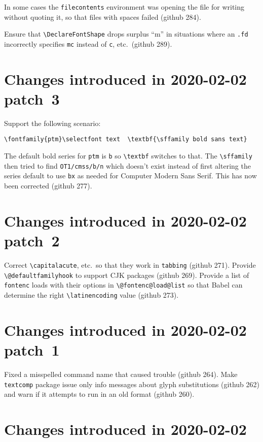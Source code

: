 \documentclass{ltxguide}
\newcommand\ghissue[1]{github #1}
\newcommand\ghissue[1]{%
    \href{https://github.com/latex3/latex2e/issues/#1}{github #1}}
\begin{document}
In some cases the \texttt{filecontents} environment was opening the
file for writing without quoting it, so that files with spaces failed
(\ghissue{284}).

Ensure that \verb=\DeclareFontShape= drops surplus ``m'' in situations
where an \texttt{.fd} incorrectly specifies \texttt{mc} instead of
\texttt{c}, etc.\ (\ghissue{289}).

\section{Changes introduced in 2020-02-02 patch~3}

Support the following scenario:
\begin{verbatim}
\fontfamily{ptm}\selectfont text  \textbf{\sffamily bold sans text}
\end{verbatim}
The default bold series for \texttt{ptm} is \texttt{b} so
\verb=\textbf= switches to that. The \verb=\sffamily= then tried to
find \texttt{OT1/cmss/b/n} which doesn't exist instead of first
altering the series default to use \texttt{bx} as needed for Computer
Modern Sans Serif. This has now been corrected (\ghissue{277}).


\section{Changes introduced in 2020-02-02 patch~2}

Correct \verb=\capitalacute=, etc.\ so that they work in
\texttt{tabbing} (\ghissue{271}).  Provide \verb=\@defaultfamilyhook= to
support CJK packages (\ghissue{269}).  Provide a list of \texttt{fontenc}
loads with their options in \verb=\@fontenc@load@list= so that Babel
can determine the right \verb=\latinencoding= value (\ghissue{273}).


\section{Changes introduced in 2020-02-02 patch~1}

Fixed a misspelled command name that caused trouble (\ghissue{264}).  Make
\texttt{textcomp} package issue only info messages about glyph
substitutions (\ghissue{262}) and warn if it attempts to run in an old format (\ghissue{260}).

\section{Changes introduced in 2020-02-02}
\end{document}
